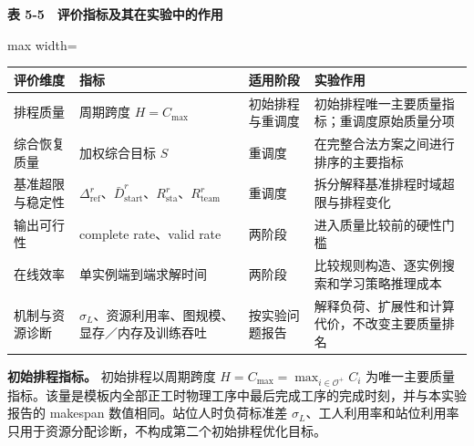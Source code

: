 \documentclass[journal,10pt]{IEEEtran}
\renewcommand{\arraystretch}{1.08}
\begin{document}
\begin{table}[!t]
\centering
\footnotesize
\textbf{表 5-5　评价指标及其在实验中的作用}\par\smallskip
\setlength{\tabcolsep}{3pt}
\renewcommand{\arraystretch}{1.08}
\begin{adjustbox}{max width=\textwidth}
\begin{tabular}{@{}
  >{\raggedright\arraybackslash}p{}
  >{\raggedright\arraybackslash}p{}
  >{\raggedright\arraybackslash}p{}
  >{\raggedright\arraybackslash}p{}@{}}
\toprule
\begin{minipage}[b]{\linewidth}\raggedright
评价维度
\end{minipage} & \begin{minipage}[b]{\linewidth}\raggedright
指标
\end{minipage} & \begin{minipage}[b]{\linewidth}\raggedright
适用阶段
\end{minipage} & \begin{minipage}[b]{\linewidth}\raggedright
实验作用
\end{minipage} \\
\midrule
排程质量 & 周期跨度 \(H=C_{\max}\) & 初始排程与重调度 & 初始排程唯一主要质量指标；重调度原始质量分项 \\
综合恢复质量 & 加权综合目标 \(S\) & 重调度 & 在完整合法方案之间进行排序的主要指标 \\
基准超限与稳定性 & \(\Delta_{\mathrm{ref}}^r\)、\(\bar D_{\mathrm{start}}^r\)、\(R_{\mathrm{sta}}^r\)、\(R_{\mathrm{team}}^r\) & 重调度 & 拆分解释基准排程时域超限与排程变化 \\
输出可行性 & complete rate、valid rate & 两阶段 & 进入质量比较前的硬性门槛 \\
在线效率 & 单实例端到端求解时间 & 两阶段 & 比较规则构造、逐实例搜索和学习策略推理成本 \\
机制与资源诊断 & \(\sigma_L\)、资源利用率、图规模、显存／内存及训练吞吐 & 按实验问题报告 & 解释负荷、扩展性和计算代价，不改变主要质量排名 \\
\bottomrule
\end{tabular}
\end{adjustbox}
\end{table}

\textbf{初始排程指标。} 初始排程以周期跨度 \(H=C_{\max}=\max_{i\in\mathcal O^+}C_i\) 为唯一主要质量指标。该量是模板内全部正工时物理工序中最后完成工序的完成时刻，并与本实验报告的 makespan 数值相同。站位人时负荷标准差 \(\sigma_L\)、工人利用率和站位利用率只用于资源分配诊断，不构成第二个初始排程优化目标。
\end{document}
